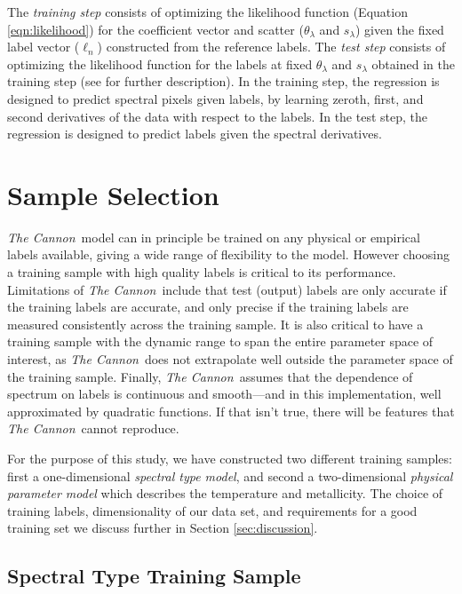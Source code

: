 \documentclass[twocolumn]{aastex62}
\newcommand{\thecannon}{\textsl{The Cannon}}
\begin{document}
The \emph{training step} consists of optimizing the likelihood function (Equation \ref{eqn:likelihood}) for the coefficient vector and scatter ($\theta_{\lambda}$ and $s_{\lambda}$) given the fixed label vector (\emph{$\ell_n$}) constructed from the reference labels. The \emph{test step} consists of optimizing the likelihood function for the labels at fixed $\theta_{\lambda}$ and $s_{\lambda}$ obtained in the training step (see \citealt{Ness:2015} for further description). 
In the training step, the regression is designed to predict spectral pixels
given labels, by learning zeroth, first, and second derivatives of the data with respect to
the labels. In the test step, the regression is designed to predict labels given the spectral
derivatives. 
 

\section{Sample Selection} \label{sec:sample_selection}

\thecannon\ model can in principle be trained on any physical or empirical labels available, giving a wide range of flexibility to the model. However choosing a training sample with high quality labels is critical to its performance.
Limitations of \thecannon\ include that test (output) labels are only accurate if the training labels are accurate, and only precise if the training labels are measured consistently across the training sample.
It is also critical to have a training sample with the dynamic range to span the entire parameter space of interest, as \thecannon\ does not extrapolate well outside the parameter space of the training sample.
Finally, \thecannon\ assumes that the dependence of spectrum on labels is continuous and smooth---and in this implementation, well approximated by quadratic functions. If that isn't true, there will be features that \thecannon\ cannot reproduce.

For the purpose of this study, we have constructed two different training samples: first a one-dimensional \emph{spectral type model}, and second a two-dimensional \emph{physical parameter model} which describes the temperature and metallicity. The choice of training labels, dimensionality of our data set, and requirements for a good training set we discuss further in Section \ref{sec:discussion}.

\subsection{Spectral Type Training Sample}
\end{document}
